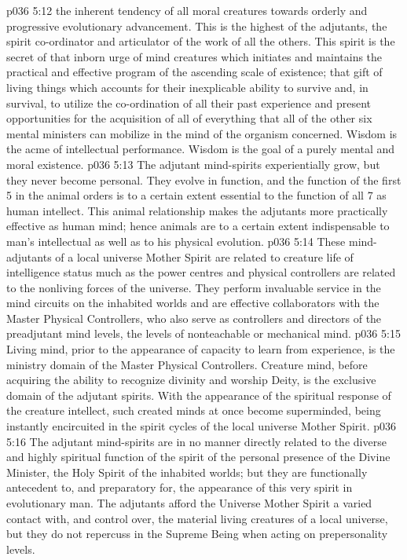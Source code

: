 \vs p036 5:12 \bibnobreakspace {} the inherent tendency of all moral creatures towards orderly and progressive evolutionary advancement. This is the highest of the adjutants, the spirit co\hyp{}ordinator and articulator of the work of all the others. This spirit is the secret of that inborn urge of mind creatures which initiates and maintains the practical and effective program of the ascending scale of existence; that gift of living things which accounts for their inexplicable ability to survive and, in survival, to utilize the co\hyp{}ordination of all their past experience and present opportunities for the acquisition of all of everything that all of the other six mental ministers can mobilize in the mind of the organism concerned. Wisdom is the acme of intellectual performance. Wisdom is the goal of a purely mental and moral existence.
\vs p036 5:13 \pc The adjutant mind\hyp{}spirits experientially grow, but they never become personal. They evolve in function, and the function of the first 5 in the animal orders is to a certain extent essential to the function of all 7 as human intellect. This animal relationship makes the adjutants more practically effective as human mind; hence animals are to a certain extent indispensable to man’s intellectual as well as to his physical evolution.
\vs p036 5:14 These mind\hyp{}adjutants of a local universe Mother Spirit are related to creature life of intelligence status much as the power centres and physical controllers are related to the nonliving forces of the universe. They perform invaluable service in the mind circuits on the inhabited worlds and are effective collaborators with the Master Physical Controllers, who also serve as controllers and directors of the preadjutant mind levels, the levels of nonteachable or mechanical mind.
\vs p036 5:15 Living mind, prior to the appearance of capacity to learn from experience, is the ministry domain of the Master Physical Controllers. Creature mind, before acquiring the ability to recognize divinity and worship Deity, is the exclusive domain of the adjutant spirits. With the appearance of the spiritual response of the creature intellect, such created minds at once become superminded, being instantly encircuited in the spirit cycles of the local universe Mother Spirit.
\vs p036 5:16 The adjutant mind\hyp{}spirits are in no manner directly related to the diverse and highly spiritual function of the spirit of the personal presence of the Divine Minister, the Holy Spirit of the inhabited worlds; but they are functionally antecedent to, and preparatory for, the appearance of this very spirit in evolutionary man. The adjutants afford the Universe Mother Spirit a varied contact with, and control over, the material living creatures of a local universe, but they do not repercuss in the Supreme Being when acting on prepersonality levels.
